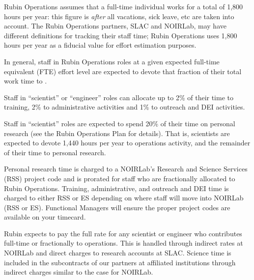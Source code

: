 
Rubin Operations assumes that a full-time individual works for a total of 1,800 hours per year: this figure is \emph{after} all vacations, sick leave, etc are taken into account.
The Rubin Operations partners, SLAC and NOIRLab, may have different definitions for tracking their staff time; Rubin Operations uses 1,800 hours per year as a fiducial value for effort estimation purposes.

In general, staff in Rubin Operations roles at a given expected full-time equivalent (FTE) effort level are expected to devote that fraction of their total work time to \RO.

Staff in ``scientist'' or ``engineer'' roles can allocate up to 2\% of their time to training, 2\% to administrative activities and 1\% to outreach and DEI activities.

Staff in ``scientist'' roles are expected to spend 20\% of their time on personal research (see the Rubin Operations Plan for details).
That is, scientists are expected to devote 1,440 hours per
year to operations activity, and the remainder of their time to personal research.

Personal research time is charged to a NOIRLab's Research and Science Services (RSS) project code and is prorated for staff who are fractionally allocated to Rubin Operations. 
Training, administrative, and outreach and DEI time is charged to either RSS or ES depending on where staff will move into NOIRLab (RSS or ES). 
Functional Managers will ensure the proper project codes are available on your timecard.

Rubin expects to pay the full rate for any scientist or engineer who contributes full-time or fractionally to operations.
This is handled through indirect rates at NOIRLab and direct charges to research accounts at SLAC.
Science time is included in the subcontracts of our partners at affiliated institutions through indirect charges
similar to the case for NOIRLab.

